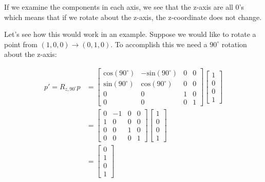 \documentclass[12pt,letterpaper]{article}
\begin{document}
If we examine the components in each axis, we see that the z-axis are all 0's which means that if we rotate about the z-axis, the z-coordinate does not change.

\newpage

Let's see how this would work in an example. Suppose we would like to rotate a point from $(1, 0, 0) \rightarrow (0, 1, 0)$. To accomplish this we need a $90^{\circ}$ rotation about the z-axis:

\begin{equation}
    \begin{aligned}
    p' = R_{z, 90^{\circ}}p
    &= \begin{bmatrix}
        \text{cos}(90^{\circ}) & -\text{sin}(90^{\circ}) & 0 & 0 \\
        \text{sin}(90^{\circ}) &  \text{cos}(90^{\circ}) & 0 & 0 \\
        0 & 0 & 1 & 0 \\
        0 & 0 & 0 & 1
    \end{bmatrix}
     \begin{bmatrix}
        1 \\
        0 \\
        0 \\
        1
    \end{bmatrix} \\
    &= \begin{bmatrix}
        0 & -1 & 0 & 0 \\
        1 & 0  & 0 & 0 \\
        0 & 0  & 1 & 0 \\
        0 & 0  & 0 & 1
    \end{bmatrix}
     \begin{bmatrix}
        1 \\
        0 \\
        0 \\
        1
    \end{bmatrix} \\
    &= \begin{bmatrix}
        0 \\
        1 \\
        0 \\
        1
    \end{bmatrix}
    \end{aligned}
\end{equation}
\end{document}
